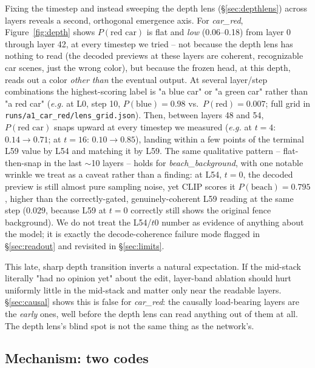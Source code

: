 \documentclass[10pt,twocolumn,letterpaper]{article}
\newcommand{\eg}{\emph{e.g.}}
\begin{document}
Fixing the timestep and instead sweeping the depth lens (\S\ref{sec:depthlens})
across layers reveals a second, orthogonal emergence axis. For
\emph{car\_red}, Figure~\ref{fig:depth} shows $P(\text{red car})$ is flat
and \emph{low} (0.06--0.18) from layer 0 through layer 42, at every
timestep we tried -- not because the depth lens has nothing to read
(the decoded previews at these layers are coherent, recognizable car
scenes, just the wrong color), but because the frozen head, at this
depth, reads out a color \emph{other than} the eventual output. At
several layer/step combinations the highest-scoring label is "a blue
car" or "a green car" rather than "a red car" (\eg{} at L0, step 10,
$P(\text{blue})=0.98$ vs.\ $P(\text{red})=0.007$; full grid in
\texttt{runs/a1\_car\_red/lens\_grid.json}). Then, between layers 48 and
54, $P(\text{red car})$ snaps upward at every timestep we measured (\eg{}
at $t{=}4$: $0.14\to0.71$; at $t{=}16$: $0.10\to0.85$), landing within a
few points of the terminal L59 value by L54 and matching it by L59. The
same qualitative pattern -- flat-then-snap in the last $\sim$10 layers --
holds for \emph{beach\_background}, with one notable wrinkle we treat as
a caveat rather than a finding: at L54, $t{=}0$, the decoded preview is
still almost pure sampling noise, yet CLIP scores it $P(\text{beach})=0.795$,
higher than the correctly-gated, genuinely-coherent L59 reading at the
same step ($0.029$, because L59 at $t{=}0$ correctly still shows the
original fence background). We do not treat the L54/$t$0 number as
evidence of anything about the model; it is exactly the decode-coherence
failure mode flagged in \S\ref{sec:readout} and revisited in
\S\ref{sec:limits}.

This late, sharp depth transition inverts a natural expectation. If the
mid-stack literally "had no opinion yet" about the edit, layer-band
ablation should hurt uniformly little in the mid-stack and matter only
near the readable layers. \S\ref{sec:causal} shows this is false for
\emph{car\_red}: the causally load-bearing layers are the \emph{early}
ones, well before the depth lens can read anything out of them at all.
The depth lens's blind spot is not the same thing as the network's.
\subsection{Mechanism: two codes}\label{sec:mechanism}
\end{document}
